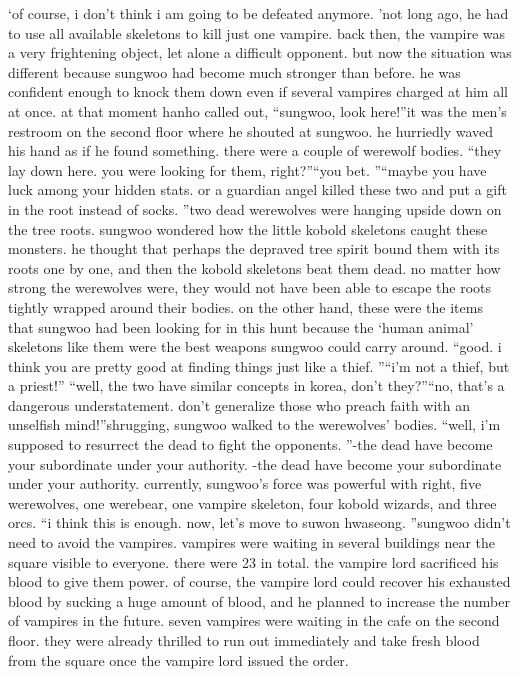 ‘of course, i don’t think i am going to be defeated anymore.
’not long ago, he had to use all available skeletons to kill just one vampire.
back then, the vampire was a very frightening object, let alone a difficult opponent.
but now the situation was different because sungwoo had become much stronger than before.
he was confident enough to knock them down even if several vampires charged at him all at once.
at that moment hanho called out, “sungwoo, look here!”it was the men’s restroom on the second floor where he shouted at sungwoo.
 he hurriedly waved his hand as if he found something.
 there were a couple of werewolf bodies.
“they lay down here.
 you were looking for them, right?”“you bet.
”“maybe you have luck among your hidden stats.
 or a guardian angel killed these two and put a gift in the root instead of socks.
”two dead werewolves were hanging upside down on the tree roots.
sungwoo wondered how the little kobold skeletons caught these monsters.
 he thought that perhaps the depraved tree spirit bound them with its roots one by one, and then the kobold skeletons beat them dead.
 no matter how strong the werewolves were, they would not have been able to escape the roots tightly wrapped around their bodies.
on the other hand, these were the items that sungwoo had been looking for in this hunt because the ‘human animal’ skeletons like them were the best weapons sungwoo could carry around.
“good.
 i think you are pretty good at finding things just like a thief.
”“i’m not a thief, but a priest!”
“well, the two have similar concepts in korea, don’t they?”“no, that’s a dangerous understatement.
 don’t generalize those who preach faith with an unselfish mind!”shrugging, sungwoo walked to the werewolves’ bodies.
“well, i’m supposed to resurrect the dead to fight the opponents.
”-the dead have become your subordinate under your authority.
-the dead have become your subordinate under your authority.
currently, sungwoo’s force was powerful with right, five werewolves, one werebear, one vampire skeleton, four kobold wizards, and three orcs.
“i think this is enough.
 now, let’s move to suwon hwaseong.
”sungwoo didn’t need to avoid the vampires.
vampires were waiting in several buildings near the square visible to everyone.
there were 23 in total.
 the vampire lord sacrificed his blood to give them power.
of course, the vampire lord could recover his exhausted blood by sucking a huge amount of blood, and he planned to increase the number of vampires in the future.
seven vampires were waiting in the cafe on the second floor.
 they were already thrilled to run out immediately and take fresh blood from the square once the vampire lord issued the order.
